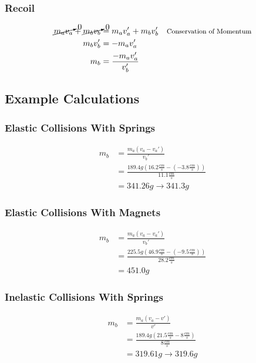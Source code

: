 \documentclass[12pt]{article}
\begin{document}
\subsubsection{Recoil}
\begin{equation}
	\begin{aligned}
		\cancelto{0}{m_av_a}+\cancelto{0}{m_bv_b} & =m_av_a'+m_bv_b' & \text{\footnotesize{Conservation of Momentum}} \\
		m_bv_b'&=-m_av_a' \\
		m_b&=\frac{-m_av_a'}{v_b'}
	\end{aligned}
\end{equation}
\subsection{Example Calculations}
\subsubsection{Elastic Collisions With Springs}
\begin{equation}
	\begin{aligned}
		m_b & =\frac{m_a(v_a-v_a')}{v_b'}                                           \\
		    & =\frac{189.4g(16.2\frac{cm}{s}-(-3.8\frac{cm}{s}))}{11.1\frac{cm}{s}} \\
		    & =341.26g\rightarrow341.3g                                             
	\end{aligned}
\end{equation}
\subsubsection{Elastic Collisions With Magnets}
\begin{equation}
	\begin{aligned}
		m_b & =\frac{m_a(v_a-v_a')}{v_b'}                                           \\
		    & =\frac{225.5g(46.9\frac{cm}{s}-(-9.5\frac{cm}{s}))}{28.2\frac{cm}{s}} \\
		    & =451.0g                                                               
	\end{aligned}
\end{equation}
\subsubsection{Inelastic Collisions With Springs}
\begin{equation}
	\begin{aligned}
		m_b & =\frac{m_a(v_a-v')}{v'}                                       \\
		    & =\frac{189.4g(21.5\frac{cm}{s}-8\frac{cm}{s})}{8\frac{cm}{s}} \\
		    & =319.61g\rightarrow319.6g                                     
	\end{aligned}
\end{equation}
\end{document}
